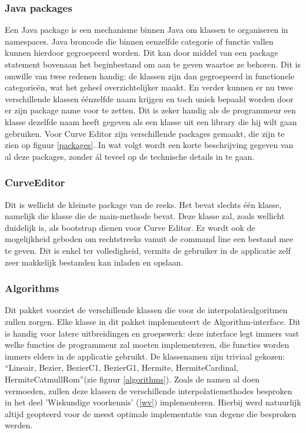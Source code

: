 \documentclass[a4paper,11pt,oneside, titlepage]{article}
\begin{document}
\subsubsection{Java packages}
Een Java package is een mechanisme binnen Java om klassen te organiseren in namespaces. 
Java broncode die binnen eenzelfde categorie of functie vallen kunnen hierdoor gegroepeerd 
worden. Dit kan door middel van een package statement bovenaan het beginbestand om aan te 
geven waartoe ze behoren. Dit is omwille van twee redenen handig: de klassen zijn dan gegroepeerd
in functionele categorie\"en, wat het geheel overzichtelijker maakt. En verder kunnen er nu twee 
verschillende klassen \'e\'enzelfde naam krijgen en toch uniek bepaald worden door er zijn
package name voor te zetten. Dit is zeker handig als de programmeur een klasse dezelfde naam
heeft gegeven als een klasse uit een library die hij wilt gaan gebruiken.\newline \newline
Voor Curve Editor zijn verschillende packages gemaakt, die zijn te zien op figuur \ref{packages}.
In wat volgt wordt een korte beschrijving gegeven van al deze packages, zonder \'al teveel op de technische details in
te gaan.
\subsubsection{CurveEditor}
Dit is wellicht de kleinste package van de reeks. Het bevat slechts \'e\'en klasse, 
namelijk die klasse die de main-methode bevat. Deze klasse zal, zoals wellicht duidelijk is, als bootstrap dienen voor Curve Editor. 
Er wordt ook de mogelijkheid geboden om rechtstreeks vanuit
de command line een bestand mee te geven. Dit is enkel ter volledigheid, vermits de gebruiker in de applicatie zelf zeer makkelijk bestanden kan inladen en opslaan.
\subsubsection{Algorithms}
Dit pakket voorziet de verschillende klassen die voor de interpolatiealgoritmen zullen zorgen.
Elke klasse in dit pakket implementeert de Algorithm-interface. Dit is handig voor latere uitbreidingen en groepswerk: deze interface 
legt immers vast welke functies de programmeur zal moeten implementeren, die functies worden immers elders in de applicatie gebruikt. \newline
De klassenamen zijn triviaal gekozen: ``Lineair, Bezier, BezierC1, BezierG1, Hermite, 
HermiteCardinal, HermiteCatmullRom''(zie figuur \ref{algorithms}). 
Zoals de namen al doen vermoeden, zullen deze klassen de verschillende
interpolatiemethodes besproken in het deel 'Wiskundige voorkennis' (\ref{wv}) implementeren.
Hierbij werd natuurlijk altijd geopteerd voor de meest optimale implementatie van degene die 
besproken werden.
\end{document}
